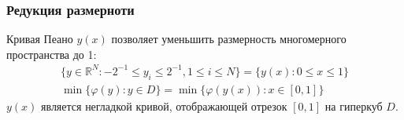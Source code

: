 \documentclass[aspectratio=1610]{beamer}
\begin{document}
\begin{frame}
  \begin{center}
  \frametitle{Редукция размерноти}
  Кривая Пеано \(y(x)\) позволяет уменьшить размерность многомерного пространства до 1:
  \begin{gather}
    \lbrace y\in \mathbb{R}^N:-2^{-1}\leqslant y_i\leqslant 2^{-1},1\leqslant i\leqslant N\rbrace=\{y(x):0\leqslant x\leqslant 1\} \nonumber \\
    \min\{\varphi(y): y\in D\}=\min\{\varphi(y(x)): x\in [0,1]\} \nonumber
  \end{gather}
  \(y(x)\) является негладкой кривой, отображающей отрезок \([0,1]\) на гиперкуб \(D\).
  \begin{figure}[ht]
    \vspace*{-0.5cm}
  \end{figure}
\end{center}
\end{frame}
\end{document}
